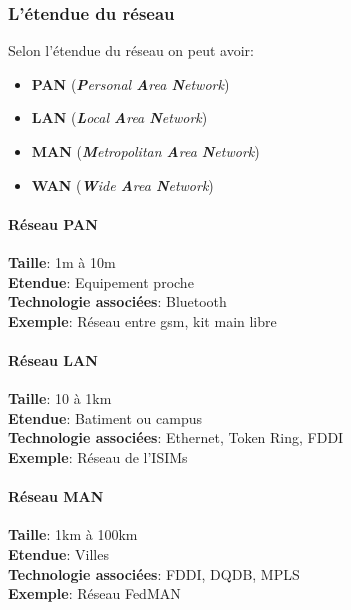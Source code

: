 \documentclass[10pt,a4paper]{article}
\begin{document}
 \subsubsection{L'étendue du réseau}
 Selon l'étendue du réseau on peut avoir:
 \begin{itemize}
	 \item \textbf{PAN} (\textit{\textbf{P}ersonal \textbf{A}rea \textbf{N}etwork})
	 \item \textbf{LAN} (\textit{\textbf{L}ocal \textbf{A}rea \textbf{N}etwork})
	 \item \textbf{MAN} (\textit{\textbf{M}etropolitan \textbf{A}rea \textbf{N}etwork})
	 \item \textbf{WAN} (\textit{\textbf{W}ide \textbf{A}rea \textbf{N}etwork})
 \end{itemize}

 \paragraph{Réseau PAN}\leavevmode

 \medskip

 \indent
 \textbf{Taille}: 1m à 10m\\
 \indent
 \textbf{Etendue}: Equipement proche\\
 \indent
 \textbf{Technologie associées}: Bluetooth\\
 \indent
 \textbf{Exemple}: Réseau entre gsm, kit main libre\\

 \paragraph{Réseau LAN}\leavevmode

 \medskip

 \indent
 \textbf{Taille}: 10 à 1km\\
 \indent
 \textbf{Etendue}: Batiment ou campus\\
 \indent
 \textbf{Technologie associées}: Ethernet, Token Ring, FDDI\\
 \indent
 \textbf{Exemple}: Réseau de l'ISIMs\\

 \paragraph{Réseau MAN}\leavevmode

 \medskip

 \indent
 \textbf{Taille}: 1km à 100km\\
 \indent
 \textbf{Etendue}: Villes\\
 \indent
 \textbf{Technologie associées}: FDDI, DQDB, MPLS\\
 \indent
 \textbf{Exemple}: Réseau FedMAN\\
\end{document}

